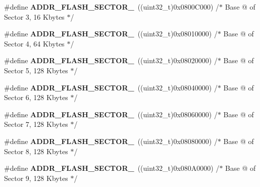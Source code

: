 \begin{DoxyCompactItemize}
\item 
\hypertarget{group___f_l_a_s_h___program_ga299b477f5a33428b1867eecc8663028a}{\#define {\bfseries A\-D\-D\-R\-\_\-\-F\-L\-A\-S\-H\-\_\-\-S\-E\-C\-T\-O\-R\-\_}~((uint32\-\_\-t)0x0800\-C000) /$\ast$ Base @ of Sector 3, 16 Kbytes $\ast$/}\label{group___f_l_a_s_h___program_ga299b477f5a33428b1867eecc8663028a}

\item 
\hypertarget{group___f_l_a_s_h___program_ga0137a47c6b41f7aef7e18d9bc280a918}{\#define {\bfseries A\-D\-D\-R\-\_\-\-F\-L\-A\-S\-H\-\_\-\-S\-E\-C\-T\-O\-R\-\_}~((uint32\-\_\-t)0x08010000) /$\ast$ Base @ of Sector 4, 64 Kbytes $\ast$/}\label{group___f_l_a_s_h___program_ga0137a47c6b41f7aef7e18d9bc280a918}

\item 
\hypertarget{group___f_l_a_s_h___program_ga6e78dc4f01c1faf00384490d3536f4de}{\#define {\bfseries A\-D\-D\-R\-\_\-\-F\-L\-A\-S\-H\-\_\-\-S\-E\-C\-T\-O\-R\-\_}~((uint32\-\_\-t)0x08020000) /$\ast$ Base @ of Sector 5, 128 Kbytes $\ast$/}\label{group___f_l_a_s_h___program_ga6e78dc4f01c1faf00384490d3536f4de}

\item 
\hypertarget{group___f_l_a_s_h___program_ga353c96f72d9893b5c24e9775a6e9f999}{\#define {\bfseries A\-D\-D\-R\-\_\-\-F\-L\-A\-S\-H\-\_\-\-S\-E\-C\-T\-O\-R\-\_}~((uint32\-\_\-t)0x08040000) /$\ast$ Base @ of Sector 6, 128 Kbytes $\ast$/}\label{group___f_l_a_s_h___program_ga353c96f72d9893b5c24e9775a6e9f999}

\item 
\hypertarget{group___f_l_a_s_h___program_ga0fcae367e68209cb20aec1f31d0cef75}{\#define {\bfseries A\-D\-D\-R\-\_\-\-F\-L\-A\-S\-H\-\_\-\-S\-E\-C\-T\-O\-R\-\_}~((uint32\-\_\-t)0x08060000) /$\ast$ Base @ of Sector 7, 128 Kbytes $\ast$/}\label{group___f_l_a_s_h___program_ga0fcae367e68209cb20aec1f31d0cef75}

\item 
\hypertarget{group___f_l_a_s_h___program_ga46efd249195dc6615a5f991bf67fbfd5}{\#define {\bfseries A\-D\-D\-R\-\_\-\-F\-L\-A\-S\-H\-\_\-\-S\-E\-C\-T\-O\-R\-\_}~((uint32\-\_\-t)0x08080000) /$\ast$ Base @ of Sector 8, 128 Kbytes $\ast$/}\label{group___f_l_a_s_h___program_ga46efd249195dc6615a5f991bf67fbfd5}

\item 
\hypertarget{group___f_l_a_s_h___program_ga94b661cf00ffc288e3d2983c3d6c72ed}{\#define {\bfseries A\-D\-D\-R\-\_\-\-F\-L\-A\-S\-H\-\_\-\-S\-E\-C\-T\-O\-R\-\_}~((uint32\-\_\-t)0x080\-A0000) /$\ast$ Base @ of Sector 9, 128 Kbytes $\ast$/}\label{group___f_l_a_s_h___program_ga94b661cf00ffc288e3d2983c3d6c72ed}


\end{DoxyCompactItemize}
